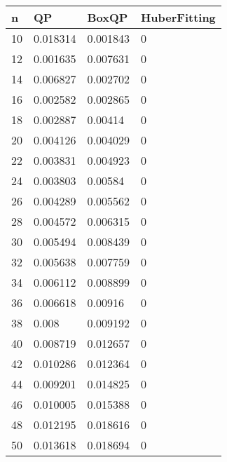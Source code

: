 \begin{tabular}{llll}
n & QP & BoxQP & HuberFitting \\ 
\hline 
10 & 0.018314 & 0.001843 & 0 \\ 
12 & 0.001635 & 0.007631 & 0 \\ 
14 & 0.006827 & 0.002702 & 0 \\ 
16 & 0.002582 & 0.002865 & 0 \\ 
18 & 0.002887 & 0.00414 & 0 \\ 
20 & 0.004126 & 0.004029 & 0 \\ 
22 & 0.003831 & 0.004923 & 0 \\ 
24 & 0.003803 & 0.00584 & 0 \\ 
26 & 0.004289 & 0.005562 & 0 \\ 
28 & 0.004572 & 0.006315 & 0 \\ 
30 & 0.005494 & 0.008439 & 0 \\ 
32 & 0.005638 & 0.007759 & 0 \\ 
34 & 0.006112 & 0.008899 & 0 \\ 
36 & 0.006618 & 0.00916 & 0 \\ 
38 & 0.008 & 0.009192 & 0 \\ 
40 & 0.008719 & 0.012657 & 0 \\ 
42 & 0.010286 & 0.012364 & 0 \\ 
44 & 0.009201 & 0.014825 & 0 \\ 
46 & 0.010005 & 0.015388 & 0 \\ 
48 & 0.012195 & 0.018616 & 0 \\ 
50 & 0.013618 & 0.018694 & 0 \\ 
\hline 
\end{tabular}